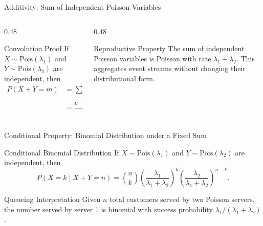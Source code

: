 \documentclass[aspectratio=169,xcolor={dvipsnames,table}]{beamer}
\begin{document}
\begin{frame}{Additivity: Sum of Independent Poisson Variables}
	\vspace{-0.15cm}
	\begin{columns}[T]
		\begin{column}{0.48\textwidth}
			\begin{block}{Convolution Proof}
				\tiny
				If $X\sim\text{Pois}(\lambda_1)$ and $Y\sim\text{Pois}(\lambda_2)$ are independent, then
				\begin{align*}
				P(X+Y=m)&=\sum_{k=0}^{m}P(X=k)P(Y=m-k)\\[-0.15em]
				&=\dfrac{e^{-(\lambda_1+\lambda_2)}(\lambda_1+\lambda_2)^m}{m!}.
				\end{align*}
			\end{block}
		\end{column}
		\begin{column}{0.48\textwidth}
			\begin{alertblock}{Reproductive Property}
				\scriptsize
				The sum of independent Poisson variables is Poisson with rate $\lambda_1+\lambda_2$. This aggregates event streams without changing their distributional form.
			\end{alertblock}
		\end{column}
	\end{columns}
\end{frame}

\begin{frame}{Conditional Property: Binomial Distribution under a Fixed Sum}
	\vspace{-0.15cm}
	\begin{block}{Conditional Binomial Distribution}
		\scriptsize
		If $X\sim\text{Pois}(\lambda_1)$ and $Y\sim\text{Pois}(\lambda_2)$ are independent, then
		$$P(X=k\mid X+Y=n)=\binom{n}{k}
		\left(\dfrac{\lambda_1}{\lambda_1+\lambda_2}\right)^k
		\left(\dfrac{\lambda_2}{\lambda_1+\lambda_2}\right)^{n-k}.$$
	\end{block}
	\begin{alertblock}{Queueing Interpretation}
		\scriptsize
		Given $n$ total customers served by two Poisson servers, the number served by server 1 is binomial with success probability $\lambda_1/(\lambda_1+\lambda_2)$.
	\end{alertblock}
\end{frame}
\end{document}
